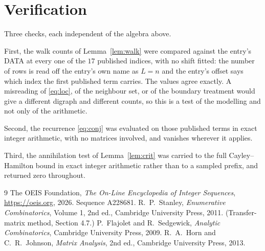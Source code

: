 \documentclass[11pt,a4paper]{article}
\theoremstyle{plain}
\theoremstyle{definition}
\begin{document}
\section{Verification}

Three checks, each independent of the algebra above.

First, the walk counts of Lemma~\ref{lem:walk} were compared against the entry's DATA at
every one of the $17$ published indices, with no shift fitted: the number of rows is
read off the entry's own name as $L=n$ and the entry's offset says which index the first
published term carries. The values agree exactly. A misreading of \eqref{eq:loc}, of the
neighbour set, or of the boundary treatment would give a different digraph and different
counts, so this is a test of the modelling and not only of the arithmetic.

Second, the recurrence \eqref{eq:conj} was evaluated on those published terms in exact
integer arithmetic, with no matrices involved, and vanishes wherever it applies.

Third, the annihilation test of Lemma~\ref{lem:crit} was carried to the full
Cayley--Hamilton bound in exact integer arithmetic rather than to a sampled prefix, and
returned zero throughout.

\begin{thebibliography}{9}
 The OEIS Foundation, \emph{The On-Line Encyclopedia of Integer
Sequences}, \url{https://oeis.org}, 2026. Sequence A228681.
 R.~P.~Stanley, \emph{Enumerative Combinatorics}, Volume 1, 2nd ed.,
Cambridge University Press, 2011. (Transfer-matrix method, Section 4.7.)
 P.~Flajolet and R.~Sedgewick, \emph{Analytic Combinatorics}, Cambridge
University Press, 2009.
 R.~A.~Horn and C.~R.~Johnson, \emph{Matrix Analysis}, 2nd ed., Cambridge
University Press, 2013.
\end{thebibliography}
\end{document}
